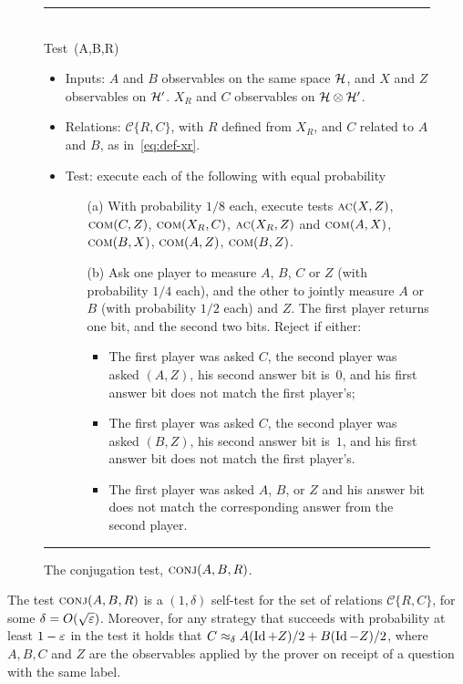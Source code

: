 \begin{figure}[H]
\rule[1ex]{\textwidth}{0.5pt}\\
Test~\conj(A,B,R) 
\begin{itemize}
    \item Inputs: $A$ and $B$ observables on the same space $\mathcal{H}$, and $X$ and $Z$ observables on $\mathcal{H}'$. $X_R$ and $C$ observables on $\mathcal{H}\otimes \mathcal{H}'$.
    \item Relations:  $\mathcal{C}\{R,C\} $, with $R$ defined from $X_R$, and $C$ related to $A$ and $B$, as in~\eqref{eq:def-xr}. 
    \item Test: execute each of the following with equal probability
		\begin{enumerate}
\item[(a)] With probability $1/8$ each, execute tests $\textsc{ac}(X,Z)$,  $\textsc{com}(C,Z)$, $\textsc{com}(X_R,C)$,   $\textsc{ac}(X_R,Z)$ and $\textsc{com}(A,X)$, $\textsc{com}(B,X)$, $\textsc{com}(A,Z)$, $\textsc{com}(B,Z)$. 
\item[(b)] Ask one player to measure $A$, $B$, $C$ or $Z$ (with probability $1/4$ each), and the other to jointly measure $A$ or $B$ (with probability $1/2$ each) and $Z$. The first player returns one bit, and the second two bits. Reject if either:
\begin{itemize}
\item The first player was asked $C$, the second player was asked $(A,Z)$, his second answer bit is~$0$, and his first answer bit does not match the first player's;
\item The first player was asked $C$, the second player was asked $(B,Z)$, his second answer bit is~$1$, and his first answer bit does not match the first player's.
\item The first player was asked $A$, $B$, or $Z$ and his answer bit does not match the corresponding answer from the second player.
\end{itemize}
\end{enumerate}
\end{itemize}
\rule[2ex]{\textwidth}{0.5pt}\vspace{-0.5cm}
\caption{The conjugation test, $\textsc{conj}(A,B,R)$.}
\label{fig:conjugation-test-1}
\end{figure}

\begin{lemma}\label{lem:conj}
The test $\textsc{conj}(A,B,R)$ is a $(1,\delta)$ self-test for the set of relations
  $\mathcal{C}\{R,C\}$, for some $\delta = O(\sqrt{\varepsilon})$. Moreover, for any
  strategy that succeeds with probability at least $1-\varepsilon$ in the test it holds
  that $C \approx_{\delta} A  (\mathop{\rm Id}\nolimits+Z)/2 + B
 (\mathop{\rm Id}\nolimits-Z)/2$, where $A,B,C$ and $Z$ are the observables applied by the prover on receipt of a question with the same label. 
\end{lemma}

